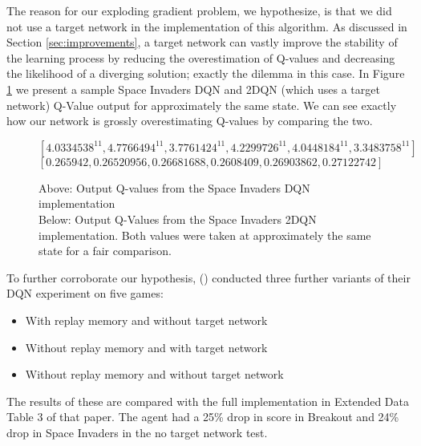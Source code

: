 The reason for our exploding gradient problem, we hypothesize, is that we did not use a target network in the implementation of this algorithm. As discussed in Section \ref{sec:improvements}, a target network can vastly improve the stability of the learning process by reducing the overestimation of Q-values and decreasing the likelihood of a diverging solution; exactly the dilemma in this case. In Figure \ref{fig:qvalues} we present a sample Space Invaders DQN and 2DQN (which uses a target network) Q-Value output for approximately the same state. We can see exactly how our network is grossly overestimating Q-values by comparing the two.

\begin{figure}[H]
	\centering
	$[4.0334538^{11}, 4.7766494^{11}, 3.7761424^{11}, 4.2299726^{11}, 4.0448184^{11}, 3.3483758^{11}]$ \\
	$[0.265942,  0.26520956,  0.26681688,  0.2608409, 0.26903862,  0.27122742]$
	\caption{Above: Output Q-values from the Space Invaders DQN implementation \\
		Below: Output Q-Values from the Space Invaders 2DQN implementation. Both values were taken at approximately the same state for a fair comparison.}
	\label{fig:qvalues}
\end{figure}

To further corroborate our hypothesis, (\citet{human}) conducted three further variants of their DQN experiment on five games:
\begin{itemize}
	\item With replay memory and without target network
	\item Without replay memory and with target network
	\item Without replay memory and without target network
\end{itemize}

The results of these are compared with the full implementation in Extended Data Table 3 of that paper. The agent had a 25\% drop in score in Breakout and 24\% drop in Space Invaders in the no target network test. \paragraph{}

